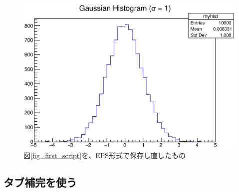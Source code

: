 \begin{figure}
  \centering
  \includegraphics[width=12cm,clip]{fig/first_script.eps}
  \caption{図\ref{fig_first_script}を、EPS形式で保存し直したもの}
  \label{fig_first_script_eps}
\end{figure}

\subsection{タブ補完を使う}

